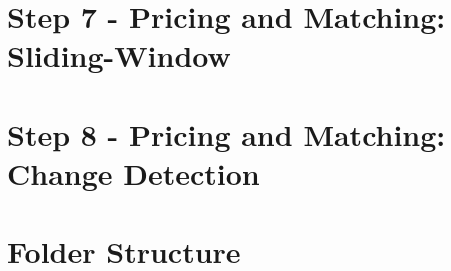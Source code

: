     \section*{Step 7 - Pricing and Matching: Sliding-Window}
    \label{sect:Step 7 - Pricing and Matching: Sliding-Window}
		
    \section*{Step 8 - Pricing and Matching: Change Detection}
    \label{sect:Step 8 - Pricing and Matching: Change Detection}
	
     \section*{Folder Structure}
     \label{sect:Folder Structure}
     	
